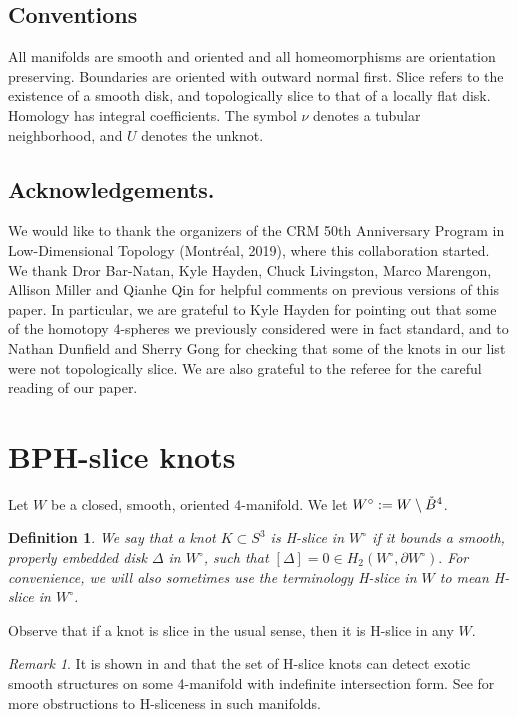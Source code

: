 \documentclass [11pt]{amsart}
\newtheorem {definition}[theorem]{Definition}
\theoremstyle{remark}
\newtheorem {remark}[theorem]{Remark}
\def\Wo{W^{\circ}}
\def\del{\partial}
\newcommand\intB{\smash{\mathring{B}^4}}
\begin{document}
\subsection{Conventions}
All manifolds are smooth and oriented and all homeomorphisms are orientation preserving. Boundaries are oriented with outward normal first. Slice refers to the existence of a smooth disk, and topologically slice to that of a locally flat disk. Homology has integral coefficients. The symbol $\nu$ denotes a tubular neighborhood, and $U$ denotes the unknot.

\subsection{Acknowledgements.} We would like to thank the organizers of the CRM 50th Anniversary Program in Low-Dimensional Topology (Montr\'eal, 2019), where this collaboration started. We thank Dror Bar-Natan, Kyle Hayden, Chuck Livingston, Marco Marengon, Allison Miller and Qianhe Qin for helpful comments on previous versions of this paper. In particular, we are grateful to Kyle Hayden for pointing out that some of the homotopy $4$-spheres we previously considered were in fact standard, and to Nathan Dunfield and Sherry Gong for checking that some of the knots in our list were not topologically slice. We are also grateful to the referee for the careful reading of our paper.




\section{BPH-slice knots}
\label{sec:BPH}
Let $W$ be a closed, smooth, oriented $4$-manifold. We let $\Wo := W \setminus \intB$.
\begin{definition}
We say that a knot $K \subset S^3$ is {\em H-slice in $\Wo$} if it bounds a smooth, properly embedded disk $\Delta$ in $\Wo$, such that $[\Delta]=0\in H_2(\Wo, \del \Wo).$ For convenience, we will also sometimes use the terminology {\em H-slice in $W$} to mean H-slice in $\Wo$.
\end{definition}
Observe that if a knot is slice in the usual sense, then it is H-slice in any $W$.

\begin{remark}
It is shown in \cite[Corollary 1.5]{MMP} and that the set of H-slice knots can detect exotic smooth structures on some 4-manifold with indefinite intersection form. See \cite{MMP, IMT} for more obstructions to H-sliceness in such manifolds.
\end{remark}
\end{document}
